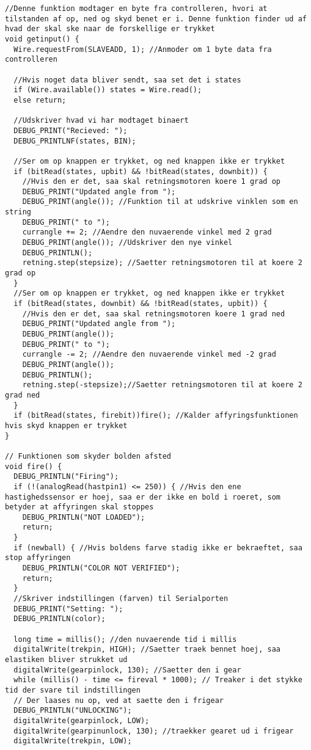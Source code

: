 \begin{lstlisting}
//Denne funktion modtager en byte fra controlleren, hvori at tilstanden af op, ned og skyd benet er i. Denne funktion finder ud af hvad der skal ske naar de forskellige er trykket
void getinput() {
  Wire.requestFrom(SLAVEADD, 1); //Anmoder om 1 byte data fra controlleren

  //Hvis noget data bliver sendt, saa set det i states
  if (Wire.available()) states = Wire.read();
  else return;

  //Udskriver hvad vi har modtaget binaert
  DEBUG_PRINT("Recieved: ");
  DEBUG_PRINTLNF(states, BIN);

  //Ser om op knappen er trykket, og ned knappen ikke er trykket
  if (bitRead(states, upbit) && !bitRead(states, downbit)) {
    //Hvis den er det, saa skal retningsmotoren koere 1 grad op
    DEBUG_PRINT("Updated angle from ");
    DEBUG_PRINT(angle()); //Funktion til at udskrive vinklen som en string
    DEBUG_PRINT(" to ");
    currangle += 2; //Aendre den nuvaerende vinkel med 2 grad
    DEBUG_PRINT(angle()); //Udskriver den nye vinkel
    DEBUG_PRINTLN();
    retning.step(stepsize); //Saetter retningsmotoren til at koere 2 grad op
  }
  //Ser om op knappen er trykket, og ned knappen ikke er trykket
  if (bitRead(states, downbit) && !bitRead(states, upbit)) {
    //Hvis den er det, saa skal retningsmotoren koere 1 grad ned
    DEBUG_PRINT("Updated angle from ");
    DEBUG_PRINT(angle());
    DEBUG_PRINT(" to ");
    currangle -= 2; //Aendre den nuvaerende vinkel med -2 grad
    DEBUG_PRINT(angle());
    DEBUG_PRINTLN();
    retning.step(-stepsize);//Saetter retningsmotoren til at koere 2 grad ned
  }
  if (bitRead(states, firebit))fire(); //Kalder affyringsfunktionen hvis skyd knappen er trykket
}

// Funktionen som skyder bolden afsted
void fire() {
  DEBUG_PRINTLN("Firing");
  if (!(analogRead(hastpin1) <= 250)) { //Hvis den ene hastighedssensor er hoej, saa er der ikke en bold i roeret, som betyder at affyringen skal stoppes
    DEBUG_PRINTLN("NOT LOADED");
    return;
  }
  if (newball) { //Hvis boldens farve stadig ikke er bekraeftet, saa stop affyringen
    DEBUG_PRINTLN("COLOR NOT VERIFIED");
    return;
  }
  //Skriver indstillingen (farven) til Serialporten
  DEBUG_PRINT("Setting: ");
  DEBUG_PRINTLN(color);

  long time = millis(); //den nuvaerende tid i millis
  digitalWrite(trekpin, HIGH); //Saetter traek bennet hoej, saa elastiken bliver strukket ud
  digitalWrite(gearpinlock, 130); //Saetter den i gear
  while (millis() - time <= fireval * 1000); // Treaker i det stykke tid der svare til indstillingen
  // Der laases nu op, ved at saette den i frigear
  DEBUG_PRINTLN("UNLOCKING");
  digitalWrite(gearpinlock, LOW);
  digitalWrite(gearpinunlock, 130); //traekker gearet ud i frigear
  digitalWrite(trekpin, LOW);


\end{lstlisting}

